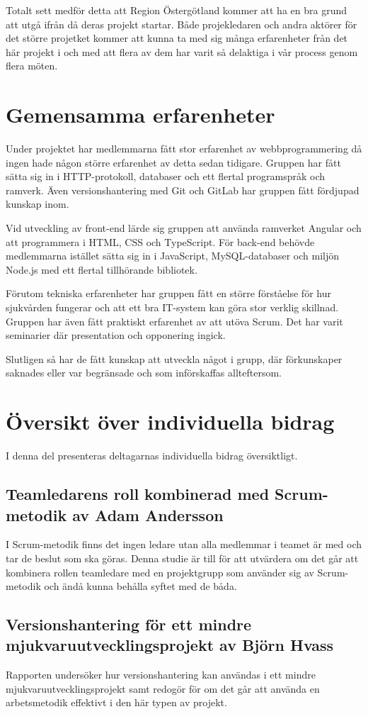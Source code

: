 Totalt sett medför detta att Region Östergötland kommer att ha en bra grund att utgå ifrån då deras projekt startar. Både projekledaren och andra aktörer för det större projetket kommer att kunna ta med sig många erfarenheter från det här projekt i och med att flera av dem har varit så delaktiga i vår process genom flera möten.

\section{Gemensamma erfarenheter}
Under projektet har medlemmarna fått stor erfarenhet av webbprogrammering då ingen hade någon större erfarenhet av detta sedan tidigare. Gruppen har fått sätta sig in i HTTP-protokoll, databaser och ett flertal programspråk och ramverk. Även versionshantering med Git och GitLab har gruppen fått fördjupad kunskap inom.

Vid utveckling av front-end lärde sig gruppen att använda ramverket Angular och att programmera i HTML, CSS och TypeScript. För back-end behövde medlemmarna istället sätta sig in i JavaScript, MySQL-databaser och miljön Node.js med ett flertal tillhörande bibliotek.

Förutom tekniska erfarenheter har gruppen fått en större förståelse för hur sjukvården fungerar och att ett bra IT-system kan göra stor verklig skillnad. Gruppen har även fått praktiskt erfarenhet av att utöva Scrum. Det har varit seminarier där presentation och opponering ingick.

Slutligen så har de fått kunskap att utveckla något i grupp, där förkunskaper saknades eller var begränsade och som införskaffas allteftersom.

\section{Översikt över individuella bidrag}
I denna del presenteras deltagarnas individuella bidrag översiktligt.

\subsection{Teamledarens roll kombinerad med Scrum-metodik av Adam Andersson}
I Scrum-metodik finns det ingen ledare utan alla medlemmar i teamet är med och tar de beslut som ska göras. Denna studie är till för att utvärdera om det går att kombinera rollen teamledare med en projektgrupp som använder sig av Scrum-metodik och ändå kunna behålla syftet med de båda.
\subsection{Versionshantering för ett mindre mjukvaruutvecklingsprojekt av Björn Hvass}
Rapporten undersöker hur versionshantering kan användas i ett mindre mjukvaruutvecklingsprojekt samt redogör för om det går att använda en arbetsmetodik effektivt i den här typen av projekt.


